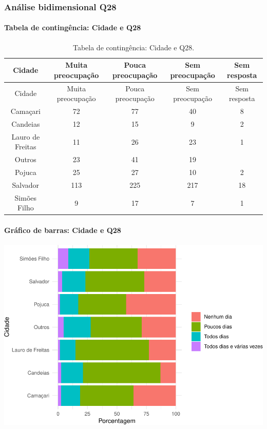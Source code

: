 \documentclass[]{article}
\let\oldparagraph\paragraph
\renewcommand{\paragraph}[1]{\oldparagraph{#1}\mbox{}}
\begin{document}
\cleardoublepage

\hypertarget{anuxe1lise-bidimensional-q28}{%
\subsubsection{Análise bidimensional Q28}\label{anuxe1lise-bidimensional-q28}}

\hypertarget{tabela-de-continguxeancia-cidade-e-q28}{%
\paragraph{Tabela de contingência: Cidade e Q28}\label{tabela-de-continguxeancia-cidade-e-q28}}

\begin{longtable}[]{@{}ccccc@{}}
\caption{\label{tab:unnamed-chunk-839}Tabela de contingência: Cidade e Q28.}\tabularnewline
\toprule
Cidade & Muita preocupação & Pouca preocupação & Sem preocupação & Sem resposta\tabularnewline
\midrule
\endfirsthead
\toprule
Cidade & Muita preocupação & Pouca preocupação & Sem preocupação & Sem resposta\tabularnewline
\midrule
\endhead
Camaçari & 72 & 77 & 40 & 8\tabularnewline
Candeias & 12 & 15 & 9 & 2\tabularnewline
Lauro de Freitas & 11 & 26 & 23 & 1\tabularnewline
Outros & 23 & 41 & 19 &\tabularnewline
Pojuca & 25 & 27 & 10 & 2\tabularnewline
Salvador & 113 & 225 & 217 & 18\tabularnewline
Simões Filho & 9 & 17 & 7 & 1\tabularnewline
\bottomrule
\end{longtable}

\hypertarget{gruxe1fico-de-barras-cidade-e-q28}{%
\paragraph{Gráfico de barras: Cidade e Q28}\label{gruxe1fico-de-barras-cidade-e-q28}}

\begin{center}\includegraphics[width=0.75\linewidth]{relatorio_covid19_files/figure-latex/unnamed-chunk-840-1} \end{center}
\end{document}
